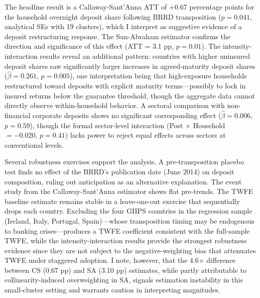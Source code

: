 \documentclass[12pt]{article}
\begin{document}
The headline result is a Callaway-Sant'Anna ATT of $+0.67$ percentage points for the household overnight deposit share following BRRD transposition ($p = 0.041$, analytical SEs with 19 clusters), which I interpret as suggestive evidence of a deposit restructuring response. The Sun-Abraham estimator confirms the direction and significance of this effect (ATT = 3.1 pp, $p = 0.01$). The intensity-interaction results reveal an additional pattern: countries with higher uninsured deposit shares saw significantly larger increases in agreed-maturity deposit shares ($\hat{\beta} = 0.261$, $p = 0.005$), one interpretation being that high-exposure households restructured toward deposits with explicit maturity terms---possibly to lock in insured returns below the guarantee threshold, though the aggregate data cannot directly observe within-household behavior. A sectoral comparison with non-financial corporate deposits shows no significant corresponding effect ($\hat{\beta} = 0.006$, $p = 0.59$), though the formal sector-level interaction (Post $\times$ Household $= -0.020$, $p = 0.41$) lacks power to reject equal effects across sectors at conventional levels.

Several robustness exercises support the analysis. A pre-transposition placebo test finds no effect of the BRRD's publication date (June 2014) on deposit composition, ruling out anticipation as an alternative explanation. The event study from the Callaway-Sant'Anna estimator shows flat pre-trends. The TWFE baseline estimate remains stable in a leave-one-out exercise that sequentially drops each country. Excluding the four GIIPS countries in the regression sample (Ireland, Italy, Portugal, Spain)---whose transposition timing may be endogenous to banking crises---produces a TWFE coefficient consistent with the full-sample TWFE, while the intensity-interaction results provide the strongest robustness evidence since they are not subject to the negative-weighting bias that attenuates TWFE under staggered adoption. I note, however, that the 4.6$\times$ difference between CS (0.67 pp) and SA (3.10 pp) estimates, while partly attributable to collinearity-induced overweighting in SA, signals estimation instability in this small-cluster setting and warrants caution in interpreting magnitudes.
\end{document}
